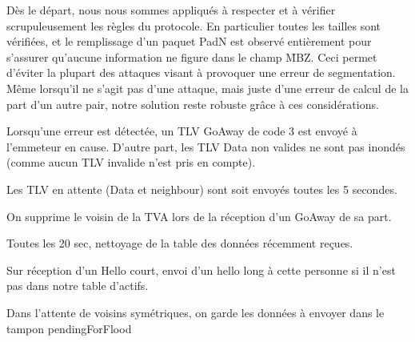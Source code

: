 \documentclass[11pt,a4paper]{article}
\begin{document}
Dès le départ, nous nous sommes appliqués à respecter et à vérifier scrupuleusement les règles du protocole. En particulier toutes les tailles sont vérifiées, et le remplissage
d'un paquet PadN est observé entièrement pour s'assurer qu'aucune information ne figure dans le champ \f{MBZ}. Ceci permet d'éviter la plupart des attaques visant à provoquer 
une erreur de segmentation. Même lorsqu'il ne s'agit pas d'une attaque, mais juste d'une erreur de calcul de la part d'un autre pair, notre solution reste robuste grâce à
ces considérations.

Lorsqu'une erreur est détectée, un TLV GoAway de code 3 est envoyé à l'emmeteur en cause. D'autre part, les TLV Data non valides ne sont pas inondés (comme aucun TLV invalide 
n'est pris en compte).
	
	Les TLV en attente (Data et neighbour) sont soit envoyés toutes les 5 secondes.
	
	On supprime le voisin de la TVA lors de la réception d'un GoAway de sa part.
	
	Toutes les 20 sec, nettoyage de la table des données récemment reçues.
	
	Sur réception d'un Hello court, envoi d'un hello long à cette personne si il n'est pas dans notre table d'actifs.
	
	Dans l'attente de voisins symétriques, on garde les données à envoyer dans le tampon pendingForFlood
	
\end{document}
